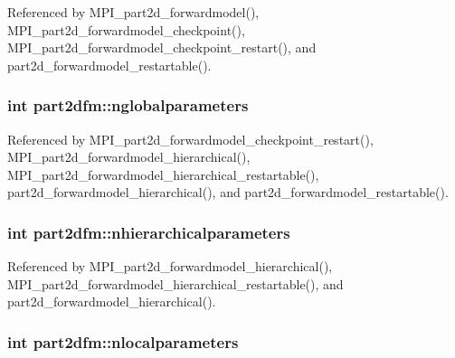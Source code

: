Referenced by M\+P\+I\+\_\+part2d\+\_\+forwardmodel(), M\+P\+I\+\_\+part2d\+\_\+forwardmodel\+\_\+checkpoint(), M\+P\+I\+\_\+part2d\+\_\+forwardmodel\+\_\+checkpoint\+\_\+restart(), and part2d\+\_\+forwardmodel\+\_\+restartable().

\subsubsection[{\texorpdfstring{nglobalparameters}{nglobalparameters}}]{\setlength{\rightskip}{0pt plus 5cm}int part2dfm\+::nglobalparameters}\hypertarget{structpart2dfm_a88681cdaf686ff60bd2f7b1313cc089f}{}\label{structpart2dfm_a88681cdaf686ff60bd2f7b1313cc089f}


Referenced by M\+P\+I\+\_\+part2d\+\_\+forwardmodel\+\_\+checkpoint\+\_\+restart(), M\+P\+I\+\_\+part2d\+\_\+forwardmodel\+\_\+hierarchical(), M\+P\+I\+\_\+part2d\+\_\+forwardmodel\+\_\+hierarchical\+\_\+restartable(), part2d\+\_\+forwardmodel\+\_\+hierarchical(), and part2d\+\_\+forwardmodel\+\_\+restartable().

\subsubsection[{\texorpdfstring{nhierarchicalparameters}{nhierarchicalparameters}}]{\setlength{\rightskip}{0pt plus 5cm}int part2dfm\+::nhierarchicalparameters}\hypertarget{structpart2dfm_a148a67222a4101bd9172e9399246c0f8}{}\label{structpart2dfm_a148a67222a4101bd9172e9399246c0f8}


Referenced by M\+P\+I\+\_\+part2d\+\_\+forwardmodel\+\_\+hierarchical(), M\+P\+I\+\_\+part2d\+\_\+forwardmodel\+\_\+hierarchical\+\_\+restartable(), and part2d\+\_\+forwardmodel\+\_\+hierarchical().

\subsubsection[{\texorpdfstring{nlocalparameters}{nlocalparameters}}]{\setlength{\rightskip}{0pt plus 5cm}int part2dfm\+::nlocalparameters}\hypertarget{structpart2dfm_a0142966417b347b4ca7092912355ff8b}{}\label{structpart2dfm_a0142966417b347b4ca7092912355ff8b}


